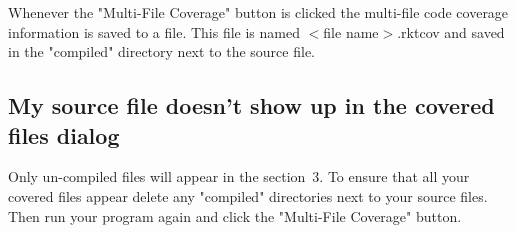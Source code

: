 \documentclass{article}
\newcommand{\postDoc}{}
\newcommand{\ChapRef}[2]{\SecRef{#1}{#2}}
\newcommand{\SecRef}[2]{section~#1}
\begin{document}
Whenever the "Multi{-}File Coverage" button is clicked the multi{-}file code coverage information is saved to a file. This file is named $<$file name$>$.rktcov and saved in the "compiled" directory next to the source file.

\subsection[My source file doesn{'}t show up in the covered files dialog]{My source file doesn{'}t show up in the covered files dialog}\label{t:x28part_x22Myx5fsourcex5ffilex5fdoesnx5ftx5fshowx5fupx5finx5fthex5fcoveredx5ffilesx5fdialogx22x29}

Only un{-}compiled files will appear in the \ChapRef{3}{Covered Files Dialog}. To ensure that all your covered files appear delete any "compiled" directories next to your source files. Then run your program again and click the "Multi{-}File Coverage" button.

\postDoc
\end{document}
